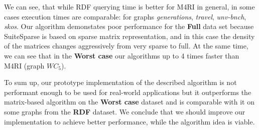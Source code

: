 We can see, that while RDF querying time is better for M4RI in general, in some cases execution times are comparable: for graphs \textit{generations}, \textit{travel},  \textit{unv-bnch}, \textit{skos}.
Our algorithm demonstates poor performance for the \textbf{Full} data set because SuiteSparse is based on sparse matrix representation, and in this case the density of the matrices changes aggressively from very sparse to full.
At the same time, we can see that in the \textbf{Worst case} our algorithms up to 4 times faster than M4RI (graph $WC_5$).

To sum up, our prototype implementation of the described algorithm is not performant enough to be used for real-world applications but it outperforms the matrix-based algorithm on the \textbf{Worst case} dataset and is comparable with it on some graphs from the \textbf{RDF} dataset.
We conclude that we should improve our implementation to achieve better performance, while the algorithm idea is viable.


